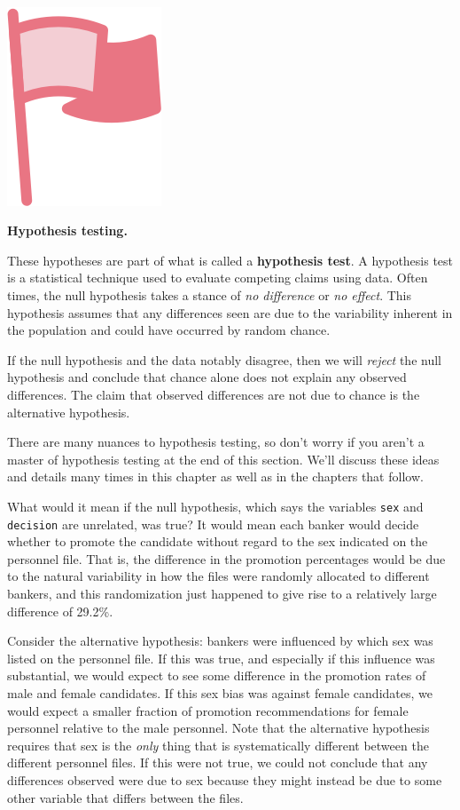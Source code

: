 \documentclass[
  10pt,
  openany]{book}
\newenvironment{mdframedwithfootImportant}
{   
    \savenotes
    \begin{mdframed}[%
    topline=true, bottomline=true, linecolor=oiR, linewidth=0.5pt,
    rightline=false, leftline=false,
    backgroundcolor=oiLGray]
    \renewcommand{\thempfootnote}{\arabic{footnote}}
    }
{
    \end{mdframed}
    \spewnotes
}
\newenvironment{important}{
    \let\oldtextbf\textbf
    \renewcommand{\textbf}[1]{{\textcolor{oiR}{\oldtextbf{##1}}}}
\vspace{4mm}
\begin{mdframedwithfootImportant}
\begin{minipage}[t]{0.10\textwidth}
{$\:$ \\ \setkeys{Gin}{width=2.5em,keepaspectratio}\includegraphics{images/_icons/important.png}}
\end{minipage}
\hfill
\begin{minipage}[t]{0.90\textwidth}
\vspace{-2mm}
\setlength{\parskip}{1em}
}{\end{minipage}
\end{mdframedwithfootImportant}
\vspace{4mm}
}
\begin{document}
\begin{important}
\textbf{Hypothesis testing.}

These hypotheses are part of what is called a \textbf{hypothesis test}.
A hypothesis test is a statistical technique used to evaluate competing claims using data.
Often times, the null hypothesis takes a stance of \emph{no difference} or \emph{no effect}.
This hypothesis assumes that any differences seen are due to the variability inherent in the population and could have occurred by random chance.

If the null hypothesis and the data notably disagree, then we will \emph{reject} the null hypothesis and conclude that chance alone does not explain any observed differences. The claim that observed differences are not due to chance is the alternative hypothesis.

There are many nuances to hypothesis testing, so don't worry if you aren't a master of hypothesis testing at the end of this section.
We'll discuss these ideas and details many times in this chapter as well as in the chapters that follow.

\end{important}

What would it mean if the null hypothesis, which says the variables \texttt{sex} and \texttt{decision} are unrelated, was true?
It would mean each banker would decide whether to promote the candidate without regard to the sex indicated on the personnel file.
That is, the difference in the promotion percentages would be due to the natural variability in how the files were randomly allocated to different bankers, and this randomization just happened to give rise to a relatively large difference of 29.2\%.

Consider the alternative hypothesis: bankers were influenced by which sex was listed on the personnel file.
If this was true, and especially if this influence was substantial, we would expect to see some difference in the promotion rates of male and female candidates.
If this sex bias was against female candidates, we would expect a smaller fraction of promotion recommendations for female personnel relative to the male personnel.
Note that the alternative hypothesis requires that sex is the \emph{only} thing that is systematically different between the different personnel files. If this were not true, we could not conclude that any differences observed were due to sex because they might instead be due to some other variable that differs between the files.
\end{document}
